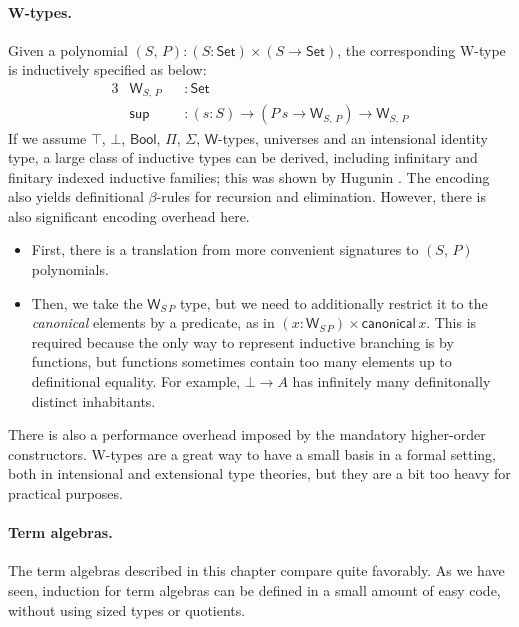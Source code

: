 \documentclass[12pt,a4paper,twoside,openany]{book}
\theoremstyle{remark}
\theoremstyle{definition}
\newcommand{\ms}[1]{\mathsf{#1}}
\newcommand{\Set}{\mathsf{Set}}
\newcommand{\Bool}{\ms{Bool}}
\begin{document}
\paragraph{W-types.} Given a polynomial $(S,\,P) : (S : \Set) \times (S \to \Set)$,
the corresponding W-type is inductively specified as below:
\begin{alignat*}{3}
  & \ms{W}_{S,\,P} &&: \Set \\
  & \ms{sup} &&: (s : S) \to (P\,s \to \ms{W}_{S,\,P}) \to \ms{W}_{S,\,P}
\end{alignat*}
If we assume $\top$, $\bot$, $\Bool$, $\Pi$, $\Sigma$, $\ms{W}$-types, universes
and an intensional identity type, a large class of inductive types can be
derived, including infinitary and finitary indexed inductive families; this
was shown by Hugunin \cite{whynotw}. The encoding also yields definitional
$\beta$-rules for recursion and elimination. However, there is also significant
encoding overhead here.
\begin{itemize}
  \item
    First, there is a translation from more convenient signatures to $(S,\,P)$ polynomials.
  \item Then, we take the $\ms{W}_{S\,P}$ type, but we need to additionally
    restrict it to the \emph{canonical} elements by a predicate, as in $(x :
    \ms{W}_{S\,P}) \times \ms{canonical}\,x$. This is required because the only
    way to represent inductive branching is by functions, but functions
    sometimes contain too many elements up to definitional equality. For
    example, $\bot \to A$ has infinitely many definitonally distinct
    inhabitants.
\end{itemize}
There is also a performance overhead imposed by the mandatory higher-order
constructors. W-types are a great way to have a small basis in a formal setting,
both in intensional and extensional type theories, but they are a bit too heavy
for practical purposes.

\paragraph{Term algebras.}
The term algebras described in this chapter compare quite favorably. As we have
seen, induction for term algebras can be defined in a small amount of easy code,
without using sized types or quotients.
\end{document}
